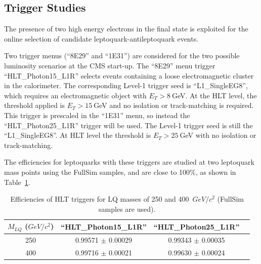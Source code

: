 \documentclass{cmspaper}
\begin{document}
\begin{linenumbers}
\section{Trigger Studies} \label{sec:trig}

The presence of two high energy electrons in the final state is 
exploited for the online selection 
of candidate leptoquark-antileptoquark events.

Two trigger menus (``8E29'' and ``1E31'')  are considered for the two
possible luminosity scenarios at the CMS start-up.
The ``8E29'' menu trigger ``HLT\_Photon15\_L1R'' selects events containing
a loose electromagnetic cluster in the calorimeter.
The corresponding Level-1 trigger seed is ``L1\_SingleEG8'', 
which requires an electromagnetic object with 
$E_T>8~$GeV. At the HLT level, the threshold applied is $E_T>15~$GeV and 
no isolation or track-matching is required.
This trigger is prescaled in the
``1E31'' menu, so instead the
``HLT\_Photon25\_L1R'' trigger will be used. 
The Level-1 trigger seed is still the ``L1\_SingleEG8''. At HLT level the 
threshold is $E_T>25~$GeV with no isolation or track-matching.

The efficiencies for leptoquarks with these triggers 
are studied at two leptoquark mass points using the FullSim 
samples, and are close to
100\%, as shown in Table~\ref{tab:HLTEffic}.

\begin{table}[htbp]
\begin{center}
\begin{tabular}{|c|c|c|c|}
\hline\hline
 $M_{LQ}$ ($GeV/c^2$)     &   ``HLT\_Photon15\_L1R''   &   ``HLT\_Photon25\_L1R'' \\
\hline\hline
250                 & 0.99571  $\pm$ 0.00029     & 0.99343  $\pm$ 0.00035   \\
400                 & 0.99716  $\pm$ 0.00021     & 0.99630  $\pm$ 0.00024   \\
\hline\hline
\end{tabular}
\end{center}
\caption{Efficiencies of HLT triggers for LQ masses of 250 and 400~$GeV/c^2$ (FullSim samples are used).}
\label{tab:HLTEffic}
\end{table}


\end{linenumbers}
\end{document}
